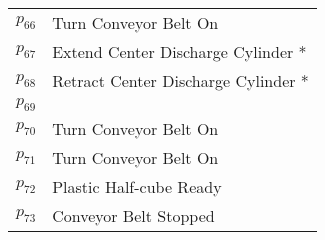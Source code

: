 \begin{longtable}{M{5cm}M{10cm}}
\hyperlink{partialNet:p66}{\hypertarget{partialTable:p66}{$p_{66}$}} & Turn Conveyor Belt On\\
\hyperlink{partialNet:p67}{\hypertarget{partialTable:p67}{$p_{67}$}} & Extend Center Discharge Cylinder *\\
\hyperlink{partialNet:p68}{\hypertarget{partialTable:p68}{$p_{68}$}} & Retract Center Discharge Cylinder *\\
\hyperlink{partialNet:p69}{\hypertarget{partialTable:p69}{$p_{69}$}} & \\
\hyperlink{partialNet:p70}{\hypertarget{partialTable:p70}{$p_{70}$}} & Turn Conveyor Belt On\\
\hyperlink{partialNet:p71}{\hypertarget{partialTable:p71}{$p_{71}$}} & Turn Conveyor Belt On\\
\hyperlink{partialNet:p72}{\hypertarget{partialTable:p72}{$p_{72}$}} & Plastic Half-cube Ready\\
\hyperlink{partialNet:p73}{\hypertarget{partialTable:p73}{$p_{73}$}} & Conveyor Belt Stopped\\
\end{longtable}
